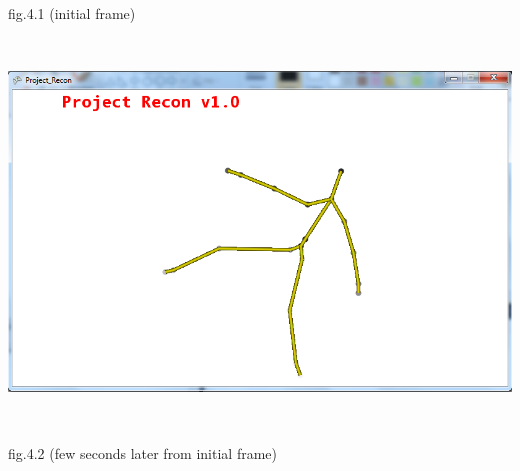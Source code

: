\documentclass[11pt]{article} %
\begin{document}
\\
\centerline{fig.4.1 (initial frame)}
\\
\centerline{\includegraphics[scale=0.5]{skeleton_frame2.png}}
\\
\centerline{fig.4.2 (few seconds later from initial frame)}
\\
\end{document}
